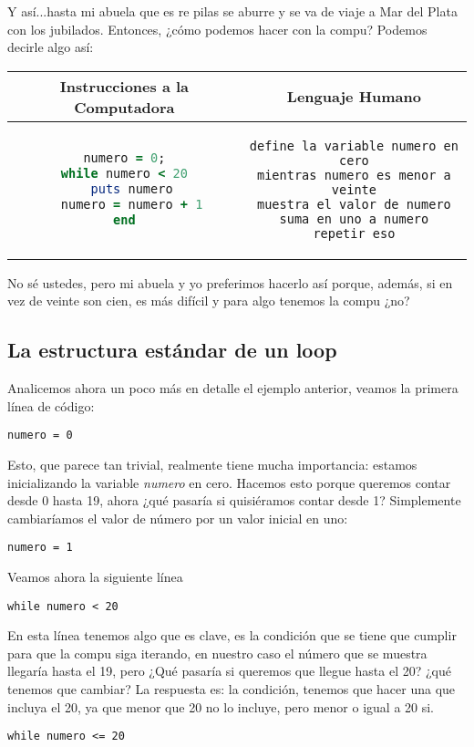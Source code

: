 Y así...hasta mi abuela que es re pilas se aburre y se va de viaje a Mar del Plata con los jubilados. Entonces, ¿cómo podemos hacer con la compu? Podemos decirle algo así:

\begin{center}
\begin{tabular}{|c|c|}
\hline
\rowcolor[gray]{0.9}Instrucciones a la Computadora & Lenguaje Humano \\
\hline
\begin{lstlisting}[language=ruby]
numero = 0;
while numero < 20
  puts numero
  numero = numero + 1
end
\end{lstlisting} & \begin{lstlisting}
define la variable numero en cero
mientras numero es menor a veinte
muestra el valor de numero
suma en uno a numero
repetir eso
\end{lstlisting} \\
\hline
\end{tabular}
\end{center}

No sé ustedes, pero mi abuela y yo preferimos hacerlo así porque, además, si en vez de veinte son cien, es más difícil y para algo tenemos la compu ¿no?

\subsection{La estructura estándar de un loop}
Analicemos ahora un poco más en detalle el ejemplo anterior, veamos la primera línea de código:

\begin{lstlisting}
numero = 0
\end{lstlisting}
Esto, que parece tan trivial, realmente tiene mucha importancia: estamos inicializando la variable \emph{numero} en cero. Hacemos esto porque queremos contar desde 0 hasta 19, ahora ¿qué pasaría si quisiéramos contar desde 1? Simplemente cambiaríamos el valor de número por un valor inicial en uno:

\begin{lstlisting}
numero = 1
\end{lstlisting}

Veamos ahora la siguiente línea
\begin{lstlisting}
while numero < 20
\end{lstlisting}

En esta línea tenemos algo que es clave, es la condición que se tiene que cumplir para que la compu siga iterando, en nuestro caso el número que se muestra llegaría hasta el 19, pero ¿Qué pasaría si queremos que llegue hasta el 20? ¿qué tenemos que cambiar? La respuesta es: la condición, tenemos que hacer una que incluya el 20, ya que menor que 20 no lo incluye, pero menor o igual a 20 si.
\begin{lstlisting}
while numero <= 20
\end{lstlisting}


